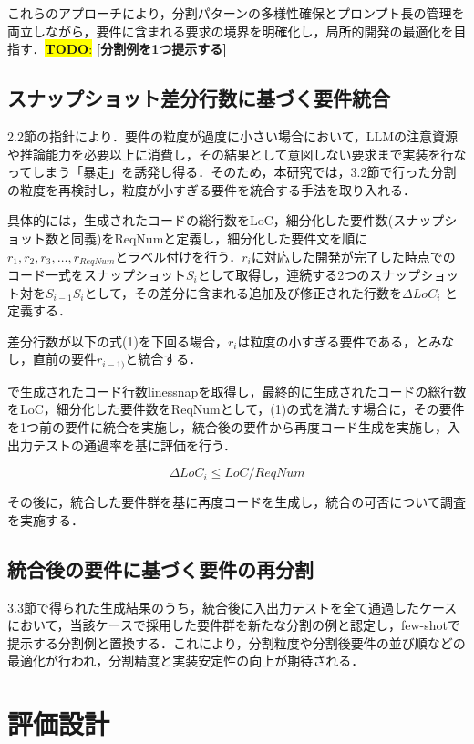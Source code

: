 \documentclass[submit,techrep,noauthor]{ipsj}
\newcommand{\todo}[1]{\colorbox{yellow}{{\bf TODO}:}{\color{red} {\textbf{[#1]}}}}
\begin{document}
これらのアプローチにより，分割パターンの多様性確保とプロンプト長の管理を両立しながら，要件に含まれる要求の境界を明確化し，局所的開発の最適化を目指す．\todo{分割例を1つ提示する}

\subsection{スナップショット差分行数に基づく要件統合}
2.2節の指針により．要件の粒度が過度に小さい場合において，LLMの注意資源や推論能力を必要以上に消費し，その結果として意図しない要求まで実装を行なってしまう「暴走」を誘発し得る．そのため，本研究では，3.2節で行った分割の粒度を再検討し，粒度が小すぎる要件を統合する手法を取り入れる．

具体的には，生成されたコードの総行数をLoC，細分化した要件数(スナップショット数と同義)をReqNumと定義し，細分化した要件文を順に $r_1, r_2, r_3,\dots,r_{ReqNum}$とラベル付けを行う．$r_i$に対応した開発が完了した時点でのコード一式をスナップショット$S_i$として取得し，連続する2つのスナップショット対を$S_{i-1}S_i$として，その差分に含まれる追加及び修正された行数を$\Delta LoC_i$ と定義する．

差分行数が以下の式(1)を下回る場合，$r_i$は粒度の小すぎる要件である，とみなし，直前の要件$r_{i-1)}$と統合する．

で生成されたコード行数linessnapを取得し，最終的に生成されたコードの総行数をLoC，細分化した要件数をReqNumとして，(1)の式を満たす場合に，その要件を1つ前の要件に統合を実施し，統合後の要件から再度コード生成を実施し，入出力テストの通過率を基に評価を行う．

\begin{equation}
    \Delta LoC_i \leq LoC / ReqNum
\end{equation}

その後に，統合した要件群を基に再度コードを生成し，統合の可否について調査を実施する．

\subsection{統合後の要件に基づく要件の再分割}
3.3節で得られた生成結果のうち，統合後に入出力テストを全て通過したケースにおいて，当該ケースで採用した要件群を新たな分割の例と認定し，few-shotで提示する分割例と置換する．これにより，分割粒度や分割後要件の並び順などの最適化が行われ，分割精度と実装安定性の向上が期待される．


\section{評価設計}
\label{sec:evaluation}
\end{document}
